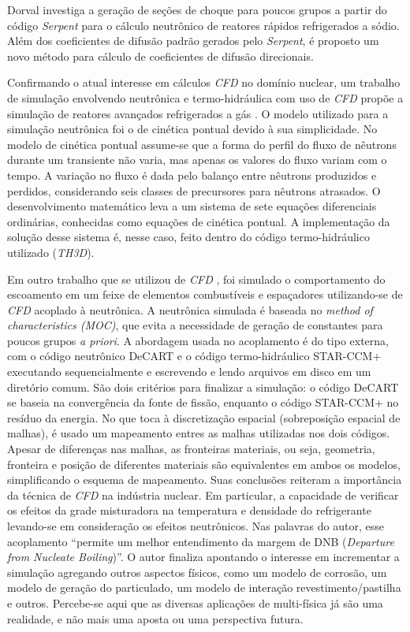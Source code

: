 Dorval \cite{Dorval2015} investiga
a geração de seções de choque para poucos grupos a partir do código \textit{Serpent} para
o cálculo neutrônico de reatores rápidos refrigerados a sódio. Além dos coeficientes de
difusão padrão gerados pelo \textit{Serpent}, é proposto um novo método para cálculo de
coeficientes de difusão direcionais. 

Confirmando o atual interesse em cálculos \textit{CFD} no domínio nuclear, um trabalho de simulação envolvendo
neutrônica e termo-hidráulica com uso de \textit{CFD} propõe a simulação de reatores avançados refrigerados
a gás \cite{Hossain2011}. O modelo utilizado 
para a simulação neutrônica foi o de cinética pontual devido à sua simplicidade. No modelo 
de cinética pontual assume-se que a forma do perfil do fluxo de nêutrons durante um transiente 
não varia, mas apenas os valores do fluxo variam com o tempo. A variação no fluxo é dada 
pelo balanço entre nêutrons produzidos e perdidos, considerando seis classes de precursores 
para nêutrons atrasados. O desenvolvimento matemático leva a um sistema de sete equações diferenciais 
ordinárias, conhecidas como equações de cinética pontual. A implementação da solução desse sistema 
é, nesse caso, feito dentro do código termo-hidráulico utilizado (\textit{TH3D}).

Em outro trabalho que se utilizou de \textit{CFD} \cite{Yan2011}, foi simulado o comportamento do escoamento em um feixe de elementos 
combustíveis e espaçadores utilizando-se de \textit{CFD} acoplado à neutrônica. A neutrônica 
simulada é baseada no \textit{method of characteristics (MOC)}, que evita a necessidade de geração 
de constantes para poucos grupos \textit{a priori}. A abordagem usada no 
acoplamento é do tipo externa, com o código neutrônico DeCART e o código termo-hidráulico 
STAR-CCM+ executando sequencialmente e escrevendo e lendo arquivos em disco em um 
diretório comum. São dois critérios para finalizar a simulação: o código DeCART se baseia 
na convergência da fonte de fissão, enquanto o código STAR-CCM+ no resíduo da energia. No que toca à 
discretização espacial (sobreposição espacial de malhas), é usado um mapeamento entres as malhas 
utilizadas nos dois códigos. Apesar de diferenças nas malhas, as fronteiras materiais, ou seja, geometria, 
fronteira e posição de diferentes materiais são equivalentes em ambos os modelos, simplificando
o esquema de mapeamento. Suas conclusões reiteram a importância da técnica de \textit{CFD} na indústria nuclear. Em particular, 
a capacidade de verificar os efeitos da grade misturadora na temperatura e densidade do refrigerante 
levando-se em consideração os efeitos neutrônicos. Nas palavras do autor, esse acoplamento 
``permite um melhor entendimento da margem de DNB (\textit{Departure from Nucleate Boiling})''.
O autor finaliza apontando o interesse em incrementar a simulação 
agregando outros aspectos físicos, como um modelo de corrosão, um modelo de geração do particulado, 
um modelo de interação revestimento/pastilha e outros. Percebe-se aqui que as diversas aplicações 
de multi-física já são uma realidade, e não mais uma aposta ou uma perspectiva futura.

